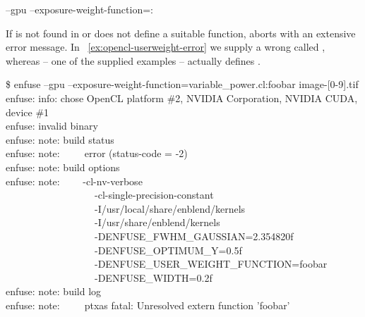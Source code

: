 \begin{literal}
  --gpu --exposure-weight-function=:\feasiblebreak
\end{literal}

If  is not found in  or does not define a suitable
function, \app{} aborts with an extensive error message.  In
\exampleName~\ref{ex:opencl-userweight-error} we supply a wrong  called
, whereas  -- one of the supplied examples --
actually defines .

\begin{exemplar}[htbp]
  \begin{maxipage}
    \centering
    \begin{terminal}
\$ enfuse --gpu --exposure-weight-function=variable\_power.cl:foobar image-[0-9].tif \\
enfuse: info: chose OpenCL platform \#2, NVIDIA Corporation, NVIDIA CUDA, device \#1 \\
enfuse: invalid binary \\
enfuse: note: build status \\
enfuse: note:~~~~~error (status-code = -2) \\
enfuse: note: build options \\
enfuse: note: ~~~~-cl-nv-verbose \bslash \\
~~~~~~~~~~~~~~~~~~-cl-single-precision-constant \bslash \\
~~~~~~~~~~~~~~~~~~-I/usr/local/share/enblend/kernels  \bslash \\
~~~~~~~~~~~~~~~~~~-I/usr/share/enblend/kernels \bslash \\
~~~~~~~~~~~~~~~~~~-DENFUSE\_FWHM\_GAUSSIAN=2.354820f \bslash \\
~~~~~~~~~~~~~~~~~~-DENFUSE\_OPTIMUM\_Y=0.5f \bslash \\
~~~~~~~~~~~~~~~~~~-DENFUSE\_USER\_WEIGHT\_FUNCTION=foobar \bslash \\
~~~~~~~~~~~~~~~~~~-DENFUSE\_WIDTH=0.2f \\
enfuse: note: build log \\
enfuse: note:~~~~~ptxas fatal: Unresolved extern function 'foobar'
    \end{terminal}
  \end{maxipage}

  \caption[ uer-weight error]{%
    \label{ex:opencl-userweight-error}%
    Error output of \App{} for an invalid (here: unknown) user-defined 
    exposure-weight function.}
\end{exemplar}


